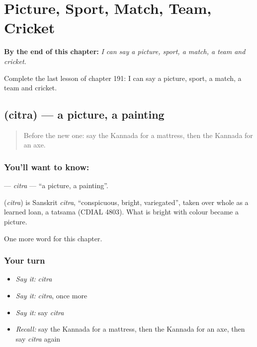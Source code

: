 
\chapter{Picture, Sport, Match, Team, Cricket}
\label{ch:ka-picture-sport-match-team-cricket}

\begin{chapteropening}
\textbf{By the end of this chapter:} \emph{I can say a picture, sport, a match, a team and cricket.}

Complete the last lesson of chapter 191: I can say a picture, sport, a match, a team and cricket.
\end{chapteropening}

\section[\texorpdfstring{\kn{ಚಿತ್ರ} (citra)}{ಚಿತ್ರ (citra)}]{ (citra) — a picture, a painting}

\label{lesson:KA-C191-citra}



\begin{quote}
Before the new one: say the Kannada for a mattress, then the Kannada for an axe.
\end{quote}

\subsection*{You'll want to know: }
\textbf{} — \emph{citra} — \textquotedblleft{}a picture, a painting\textquotedblright{}.

\begin{cousinweb}
\textbf{} (\emph{citra}) is Sanskrit \emph{citra}, \textquotedblleft{}conspicuous, bright, variegated\textquotedblright{}, taken over whole as a learned loan, a tatsama (CDIAL 4803). What is bright with colour became a picture.
\end{cousinweb}

\begin{grammarlens}[title={What you've built}]
One more word for this chapter.
\end{grammarlens}

\subsection*{Your turn}
\begin{itemize}
\raggedright
  \item \emph{Say it:} \emph{citra}
  \item \emph{Say it:} \emph{citra}, once more
  \item \emph{Say it:} say \emph{citra}
  \item \emph{Recall:} say the Kannada for a mattress, then the Kannada for an axe, then say \emph{citra} again
\end{itemize}

